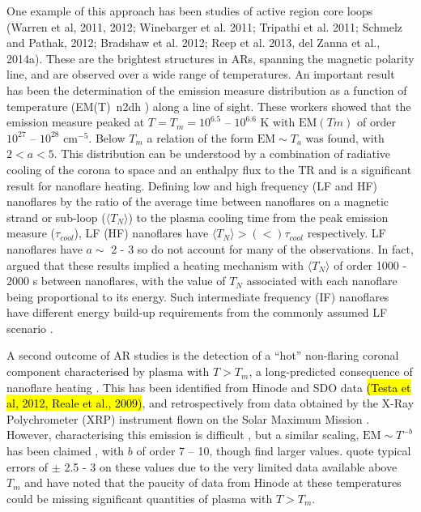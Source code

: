 \documentclass[apj]{emulateapj}
\begin{document}
	\par One example of this approach has been studies of active region core loops (Warren et al, 2011, 2012; Winebarger et al. 2011; Tripathi et al. 2011; Schmelz and Pathak, 2012; Bradshaw et al. 2012; Reep et al. 2013, del Zanna et al., 2014a). These are the brightest structures in ARs, spanning the magnetic polarity line, and are observed over a wide range of temperatures. An important result has been the determination of the emission measure distribution as a function of temperature (EM(T)~n2dh ) along a line of sight. These workers showed that the emission measure peaked at $T = T_m = 10^{6.5}$ – $10^{6.6}$ K with $\mathrm{EM}(Tm)$ of order $10^{27}$ – $10^{28}$ cm$^{-5}$.  Below $T_m$ a relation of the form $\mathrm{EM} \sim T_a$ was found, with $2 < a < 5$. This distribution can be understood by a combination of radiative cooling of the corona to space and an enthalpy flux to the TR \citep[e.g.][]{bradshaw_new_2010,bradshaw_cooling_2010} and is a significant result for nanoflare heating. Defining low and high frequency (LF and HF) nanoflares by the ratio of the average time between nanoflares on a magnetic strand or sub-loop ($\langle T_N \rangle$) to the plasma cooling time from the peak emission measure ($\tau_{cool}$), LF (HF) nanoflares have $\langle T_N \rangle > (<) \tau_{cool}$ respectively. LF nanoflares have $a \sim$ 2 - 3 so do not account for many of the observations. In fact, \citet{cargill_active_2014} argued that these results implied a heating mechanism with $\langle T_N \rangle$ of order 1000 - 2000 s between nanoflares, with the value of $T_N$ associated with each nanoflare being proportional to its energy. Such intermediate frequency (IF) nanoflares have different energy build-up requirements from the commonly assumed LF scenario \citep{cargill_active_2014}.  
%
	\par A second outcome of AR studies is the detection of a ``hot'' non-flaring coronal component characterised by plasma with $T > T_m$, a long-predicted consequence of nanoflare heating \citep{cargill_implications_1994,cargill_diagnostics_1995}. This has been identified from Hinode and SDO data \hl{(Testa et al, 2012, Reale et al., 2009)}, and retrospectively from data obtained by the X-Ray Polychrometer (XRP) instrument flown on the Solar Maximum Mission \citep{del_zanna_elemental_2014}. However, characterising this emission is difficult \citep[e.g.][]{winebarger_defining_2012}, but a similar scaling, $\mathrm{EM} \sim T^{-b}$ has been claimed \citep[e.g.][]{warren_systematic_2012}, with $b$ of order 7 – 10, though \citet{del_zanna_elemental_2014} find larger values. \citeauthor{warren_systematic_2012} quote typical errors of $\pm$ 2.5 - 3 on these values due to the very limited data available above $T_m$ and \citet{winebarger_defining_2012} have noted that the paucity of data from Hinode at these temperatures could be missing significant quantities of plasma with $T > T_m$. 
\end{document}
